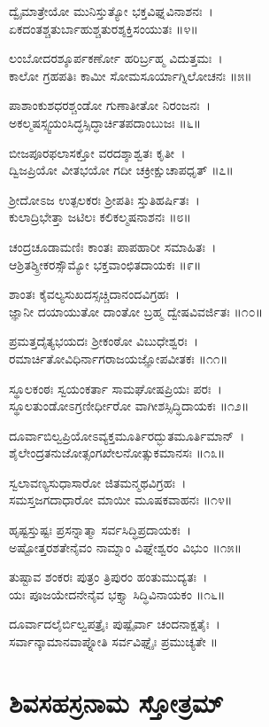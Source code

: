 ದ್ವೈಮಾತ್ರೇಯೋ ಮುನಿಸ್ತುತ್ಯೋ ಭಕ್ತವಿಘ್ನವಿನಾಶನಃ~।\\
ಏಕದಂತಶ್ಚತುರ್ಬಾಹುಶ್ಚತುರಶ್ಶಕ್ತಿಸಂಯುತಃ ॥೪॥

ಲಂಬೋದರಶ್ಶೂರ್ಪಕರ್ಣೋ ಹರಿರ್ಬ್ರಹ್ಮ ವಿದುತ್ತಮಃ~।\\
ಕಾಲೋ ಗ್ರಹಪತಿಃ ಕಾಮೀ ಸೋಮಸೂರ್ಯಾಗ್ನಿಲೋಚನಃ ॥೫॥

ಪಾಶಾಂಕುಶಧರಶ್ಚಂಡೋ ಗುಣಾತೀತೋ ನಿರಂಜನಃ~।\\
ಅಕಲ್ಮಷಸ್ಸ್ವಯಂಸಿದ್ಧಸ್ಸಿದ್ಧಾರ್ಚಿತಪದಾಂಬುಜಃ ॥೬॥

ಬೀಜಪೂರಫಲಾಸಕ್ತೋ ವರದಶ್ಶಾಶ್ವತಃ ಕೃತೀ~।\\
ದ್ವಿಜಪ್ರಿಯೋ ವೀತಭಯೋ ಗದೀ ಚಕ್ರೀಕ್ಷುಚಾಪಧೃತ್ ॥೭॥

ಶ್ರೀದೋಽಜ ಉತ್ಪಲಕರಃ ಶ್ರೀಪತಿಃ ಸ್ತುತಿಹರ್ಷಿತಃ~।\\
ಕುಲಾದ್ರಿಭೇತ್ತಾ ಜಟಿಲಃ ಕಲಿಕಲ್ಮಷನಾಶನಃ ॥೮॥

ಚಂದ್ರಚೂಡಾಮಣಿಃ ಕಾಂತಃ ಪಾಪಹಾರೀ ಸಮಾಹಿತಃ~।\\
ಆಶ್ರಿತಶ್ಶ್ರೀಕರಸ್ಸೌಮ್ಯೋ ಭಕ್ತವಾಂಛಿತದಾಯಕಃ ॥೯॥

ಶಾಂತಃ ಕೈವಲ್ಯಸುಖದಸ್ಸಚ್ಚಿದಾನಂದವಿಗ್ರಹಃ~।\\
ಜ್ಞಾನೀ ದಯಾಯುತೋ ದಾಂತೋ ಬ್ರಹ್ಮ ದ್ವೇಷವಿವರ್ಜಿತಃ ॥೧೦॥

ಪ್ರಮತ್ತದೈತ್ಯಭಯದಃ ಶ್ರೀಕಂಠೋ ವಿಬುಧೇಶ್ವರಃ~।\\
ರಮಾರ್ಚಿತೋವಿಧಿರ್ನಾಗರಾಜಯಜ್ಞೋಪವೀತಕಃ ॥೧೧॥

ಸ್ಥೂಲಕಂಠಃ ಸ್ವಯಂಕರ್ತಾ ಸಾಮಘೋಷಪ್ರಿಯಃ ಪರಃ~।\\
ಸ್ಥೂಲತುಂಡೋಽಗ್ರಣೀರ್ಧೀರೋ ವಾಗೀಶಸ್ಸಿದ್ಧಿದಾಯಕಃ ॥೧೨॥

ದೂರ್ವಾಬಿಲ್ವಪ್ರಿಯೋಽವ್ಯಕ್ತಮೂರ್ತಿರದ್ಭುತಮೂರ್ತಿಮಾನ್~।\\
ಶೈಲೇಂದ್ರತನುಜೋತ್ಸಂಗಖೇಲನೋತ್ಸುಕಮಾನಸಃ ॥೧೩॥

ಸ್ವಲಾವಣ್ಯಸುಧಾಸಾರೋ ಜಿತಮನ್ಮಥವಿಗ್ರಹಃ~।\\
ಸಮಸ್ತಜಗದಾಧಾರೋ ಮಾಯೀ ಮೂಷಕವಾಹನಃ ॥೧೪॥

ಹೃಷ್ಟಸ್ತುಷ್ಟಃ ಪ್ರಸನ್ನಾತ್ಮಾ ಸರ್ವಸಿದ್ಧಿಪ್ರದಾಯಕಃ~।\\
ಅಷ್ಟೋತ್ತರಶತೇನೈವಂ ನಾಮ್ನಾಂ ವಿಘ್ನೇಶ್ವರಂ ವಿಭುಂ ॥೧೫॥

ತುಷ್ಟಾವ ಶಂಕರಃ ಪುತ್ರಂ ತ್ರಿಪುರಂ ಹಂತುಮುದ್ಯತಃ~।\\
ಯಃ ಪೂಜಯೇದನೇನೈವ ಭಕ್ತ್ಯಾ ಸಿದ್ಧಿವಿನಾಯಕಂ ॥೧೬॥

ದೂರ್ವಾದಲೈರ್ಬಿಲ್ವಪತ್ರೈಃ ಪುಷ್ಪೈರ್ವಾ ಚಂದನಾಕ್ಷತೈಃ~।\\
ಸರ್ವಾನ್ಕಾಮಾನವಾಪ್ನೋತಿ ಸರ್ವವಿಘ್ನೈಃ ಪ್ರಮುಚ್ಯತೇ ॥
\section{ಶಿವಸಹಸ್ರನಾಮ ಸ್ತೋತ್ರಮ್}

